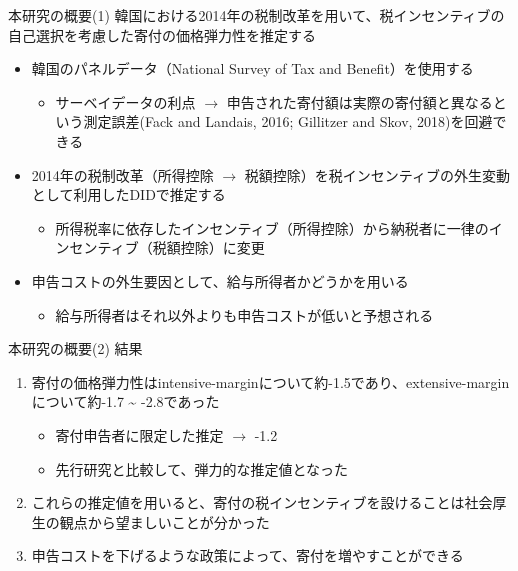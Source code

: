 \documentclass[
  ignorenonframetext,
  aspectratio=169,
]{beamer}
\providecommand{\tightlist}{%
  \setlength{\itemsep}{0pt}\setlength{\parskip}{0pt}}
\begin{document}
\begin{frame}{本研究の概要(1)}
\protect\hypertarget{ux672cux7814ux7a76ux306eux6982ux89811}{}
韓国における2014年の税制改革を用いて、税インセンティブの自己選択を考慮した寄付の価格弾力性を推定する

\begin{itemize}
\tightlist
\item
  韓国のパネルデータ（National Survey of Tax and Benefit）を使用する

  \begin{itemize}
  \tightlist
  \item
    サーベイデータの利点 \(\to\) 申告された寄付額は実際の寄付額と異なるという測定誤差(Fack and Landais, 2016; Gillitzer and Skov, 2018)を回避できる
  \end{itemize}
\item
  2014年の税制改革（所得控除 \(\to\) 税額控除）を税インセンティブの外生変動として利用したDIDで推定する

  \begin{itemize}
  \tightlist
  \item
    所得税率に依存したインセンティブ（所得控除）から納税者に一律のインセンティブ（税額控除）に変更
  \end{itemize}
\item
  申告コストの外生要因として、給与所得者かどうかを用いる

  \begin{itemize}
  \tightlist
  \item
    給与所得者はそれ以外よりも申告コストが低いと予想される
  \end{itemize}
\end{itemize}
\end{frame}

\begin{frame}{本研究の概要(2)}
\protect\hypertarget{ux672cux7814ux7a76ux306eux6982ux89812}{}
結果

\begin{enumerate}
\tightlist
\item
  寄付の価格弾力性はintensive-marginについて約-1.5であり、extensive-marginについて約-1.7 \textasciitilde{} -2.8であった

  \begin{itemize}
  \tightlist
  \item
    寄付申告者に限定した推定 \(\to\) -1.2
  \item
    先行研究と比較して、弾力的な推定値となった
  \end{itemize}
\item
  これらの推定値を用いると、寄付の税インセンティブを設けることは社会厚生の観点から望ましいことが分かった
\item
  申告コストを下げるような政策によって、寄付を増やすことができる
\end{enumerate}
\end{frame}
\end{document}
